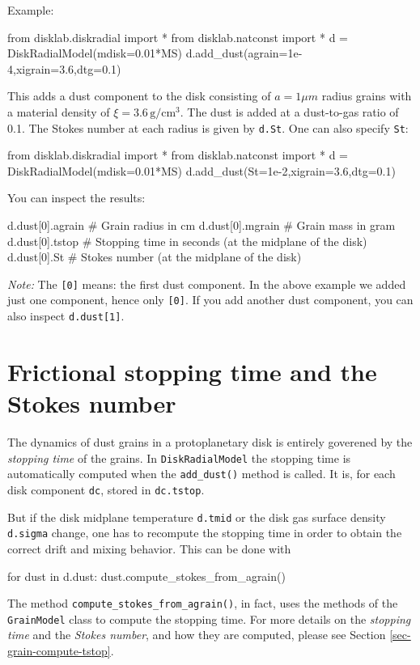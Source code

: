\documentclass{book}
\newcommand{\code}[1]{{\small\tt #1}}
\begin{document}
Example:
\begin{codebox}
from disklab.diskradial import *
from disklab.natconst import *
d = DiskRadialModel(mdisk=0.01*MS)
d.add_dust(agrain=1e-4,xigrain=3.6,dtg=0.1)
\end{codebox}
This adds a dust component to the disk consisting of $a=1\mu m$ radius
grains with a material density of $\xi=3.6\,\mathrm{g/cm^3}$. The dust is added
at a dust-to-gas ratio of 0.1. The Stokes number at each radius is given by
\code{d.St}. One can also specify \code{St}:
\begin{codebox}
from disklab.diskradial import *
from disklab.natconst import *
d = DiskRadialModel(mdisk=0.01*MS)
d.add_dust(St=1e-2,xigrain=3.6,dtg=0.1)
\end{codebox}
You can inspect the results:
\begin{codebox}
d.dust[0].agrain   # Grain radius in cm
d.dust[0].mgrain   # Grain mass in gram
d.dust[0].tstop    # Stopping time in seconds (at the midplane of the disk)
d.dust[0].St       # Stokes number (at the midplane of the disk)
\end{codebox}
{\em Note:} The \code{[0]} means: the first dust component. In the above example
we added just one component, hence only \code{[0]}. If you add another dust
component, you can also inspect \code{d.dust[1]}.

\section{Frictional stopping time and the Stokes number}
%
The dynamics of dust grains in a protoplanetary disk is entirely
goverened by the {\em stopping time} of the grains.
In \code{DiskRadialModel} the stopping time is automatically computed when the
\code{add\_dust()} method is called. It is, for each disk component
\code{dc}, stored in \code{dc.tstop}.

But if the disk midplane temperature
\code{d.tmid} or the disk gas surface density \code{d.sigma} change, one
has to recompute the stopping time in order to obtain the correct
drift and mixing behavior. This can be done with
\begin{codebox}
for dust in d.dust:
    dust.compute_stokes_from_agrain()
\end{codebox}
The method \code{compute\_stokes\_from\_agrain()}, in fact, uses the
methods of the \code{GrainModel} class to compute the stopping time.
For more details on the {\em stopping time} and the {\em Stokes number},
and how they are computed, please see Section \ref{sec-grain-compute-tstop}.
\end{document}
